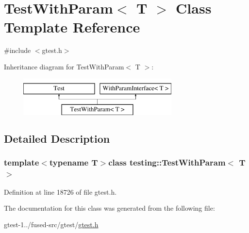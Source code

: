 \hypertarget{classtesting_1_1TestWithParam}{\section{\-Test\-With\-Param$<$ \-T $>$ \-Class \-Template \-Reference}
\label{db/d9e/classtesting_1_1TestWithParam}
}


{\ttfamily \#include $<$gtest.\-h$>$}

\-Inheritance diagram for \-Test\-With\-Param$<$ \-T $>$\-:\begin{figure}[H]
\begin{center}
\leavevmode
\includegraphics[height=2.000000cm]{db/d9e/classtesting_1_1TestWithParam}
\end{center}
\end{figure}


\subsection{\-Detailed \-Description}
\subsubsection*{template$<$typename \-T$>$class testing\-::\-Test\-With\-Param$<$ T $>$}



\-Definition at line 18726 of file gtest.\-h.



\-The documentation for this class was generated from the following file\-:\begin{DoxyCompactItemize}
\item 
gtest-\/1../fused-\/src/gtest/\hyperlink{fused-src_2gtest_2gtest_8h}{gtest.\-h}\end{DoxyCompactItemize}
